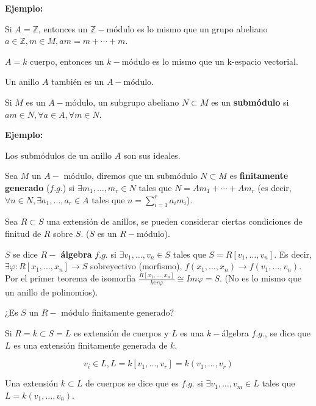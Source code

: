 \textbf{Ejemplo: }

\begin{itemize*}
\item Si $A=\mathbb{Z}$, entonces un $\mathbb{Z}-$módulo es lo mismo que un grupo abeliano $a\in \mathbb{Z},m\in M, am=m+\cdots +m$.
\item $A=k$ cuerpo, entonces un $k-$módulo es lo mismo que un k-espacio vectorial.
\item Un anillo $A$ también es un $A-$módulo.
\end{itemize*}


\begin{Def}
Si $M$ es un $A-$módulo, un subgrupo abeliano $N\subset M$ es un \textbf{submódulo} si $am\in N, \forall a \in A, \forall m \in N$.
\end{Def}

\textbf{Ejemplo: }

Los submódulos de un anillo $A$ son sus ideales.


\begin{Def}
Sea $M$ un $A-$ módulo, diremos que un submódulo $N\subset M$ es \textbf{finitamente generado} ($f.g.$) si $\exists m_1,\dots, m_r\in N$ tales que $N=Am_1+\cdots +Am_r$ (es decir, $\forall n \in N, \exists a_1,\dots, a_r\in A$ tales que $n=\sum_{i=1}^ra_im_i$).
\end{Def}

Sea $R\subset S$ una extensión de anillos, se pueden considerar ciertas condiciones de finitud de $R$ sobre $S$. ($S$ es un $R-$módulo).

\begin{itemize*}
\item $S$ se dice \textbf{$R-$ álgebra} $f.g.$ si $\exists v_1,\dots,v_n\in S$ tales que $S=R[v_1,\dots,v_n]$. Es decir, $\exists \varphi: R[x_1,\dots,x_n]\rightarrow S$ sobreyectivo (morfismo), $f(x_1,\dots,x_n)\rightarrow f(v_1,\dots,v_n)$. Por el primer teorema de isomorfía $\frac{R[x_1,\dots,x_n]}{ker\varphi}\cong Im\varphi =S$. (No es lo mismo que un anillo de polinomios).

\item ¿Es $S$ un $R-$ módulo finitamente generado?

\item Si $R=k\subset S=L$ es extensión de cuerpos y $L$ es una $k-$álgebra $f.g.$, se dice que $L$ es una extensión finitamente generada de $k$. 

$$v_i\in L, L=k[v_1,\dots,v_r]=k(v_1,\dots,v_r)$$

\item Una extensión $k\subset L$ de cuerpos se dice que es $f.g.$ si $\exists v_1,\dots,v_m\in L$ tales que $L=k(v_1,\dots,v_n)$.
\end{itemize*}

